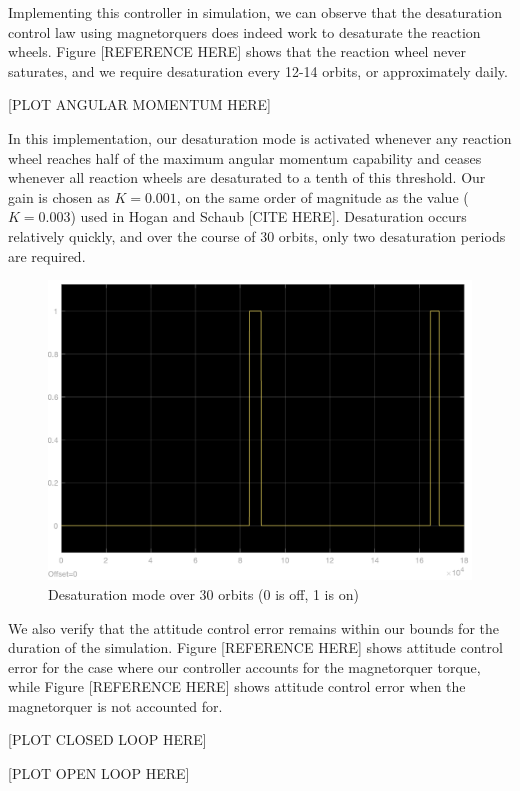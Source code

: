 Implementing this controller in simulation, we can observe that the desaturation control law using magnetorquers does indeed work to desaturate the reaction wheels. Figure [REFERENCE HERE] shows that the reaction wheel never saturates, and we require desaturation every 12-14 orbits, or approximately daily.

[PLOT ANGULAR MOMENTUM HERE]

In this implementation, our desaturation mode is activated whenever any reaction wheel reaches half of the maximum angular momentum capability and ceases whenever all reaction wheels are desaturated to a tenth of this threshold. Our gain is chosen as $K = 0.001$, on the same order of magnitude as the value ($K = 0.003$) used in Hogan and Schaub [CITE HERE]. Desaturation occurs relatively quickly, and over the course of 30 orbits, only two desaturation periods are required.

\begin{figure}[H]
\centering
\includegraphics[scale=0.25]{Images/ps10_desaturation_mode.png}
\caption{Desaturation mode over 30 orbits (0 is off, 1 is on)}
\label{fig:ps10_desaturation mode}
\end{figure}

We also verify that the attitude control error remains within our bounds for the duration of the simulation. Figure [REFERENCE HERE] shows attitude control error for the case where our controller accounts for the magnetorquer torque, while Figure [REFERENCE HERE] shows attitude control error when the magnetorquer is not accounted for.

[PLOT CLOSED LOOP HERE]

[PLOT OPEN LOOP HERE]


